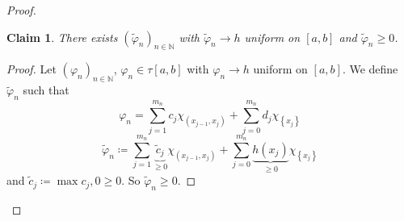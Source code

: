 \documentclass{article}
\newtheorem*{claim}{Claim}%
\newcommand{\set}[1]{\left\{#1\right\}}
\begin{document}
\begin{proof}
\begin{description}
      \begin{claim}
        There exists $(\tilde \varphi_n)_{n\in\mathbb N}$ with $\tilde \varphi_n \to h$ uniform on $[a,b]$
        and $\tilde \varphi_n \geq 0$.
      \end{claim}

      \begin{proof}
        Let $(\varphi_n)_{n\in\mathbb N}$, $\varphi_n \in \tau[a,b]$ with $\varphi_n \to h$ uniform on $[a,b]$.
        We define $\tilde\varphi_n$ such that
        \[ \varphi_n = \sum_{j=1}^{m_n} c_j \chi_{(x_{j-1}, x_j)} + \sum_{j=0}^{m_n} d_j \chi_{\set{x_j}} \]
        \[ \tilde\varphi_n \coloneqq \sum_{j=1}^{m_n} \underbrace{\tilde c_{j}}_{\geq 0} \chi_{(x_{j-1}, x_j)} + \sum_{j=0}^{m_n} \underbrace{h(x_j)}_{\geq 0} \chi_{\set{x_j}} \]
        and $\tilde c_j \coloneqq \max{c_j, 0} \geq 0$.
        So $\tilde \varphi_n \geq 0$.


\end{proof}
\end{description}
\end{proof}
\end{document}
